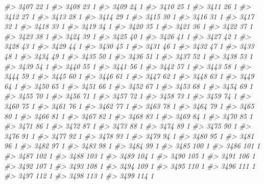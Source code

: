 \documentclass[]{article}
\newenvironment{Shaded}{\begin{snugshade}}{\end{snugshade}}
\newcommand{\CommentTok}[1]{\textcolor[rgb]{0.56,0.35,0.01}{\textit{#1}}}
\begin{document}
\begin{Shaded}
\begin{Highlighting}[]
\CommentTok{#> 3407  22  1}
\CommentTok{#> 3408  23  1}
\CommentTok{#> 3409  24  1}
\CommentTok{#> 3410  25  1}
\CommentTok{#> 3411  26  1}
\CommentTok{#> 3412  27  1}
\CommentTok{#> 3413  28  1}
\CommentTok{#> 3414  29  1}
\CommentTok{#> 3415  30  1}
\CommentTok{#> 3416  31  1}
\CommentTok{#> 3417  32  1}
\CommentTok{#> 3418  33  1}
\CommentTok{#> 3419  34  1}
\CommentTok{#> 3420  35  1}
\CommentTok{#> 3421  36  1}
\CommentTok{#> 3422  37  1}
\CommentTok{#> 3423  38  1}
\CommentTok{#> 3424  39  1}
\CommentTok{#> 3425  40  1}
\CommentTok{#> 3426  41  1}
\CommentTok{#> 3427  42  1}
\CommentTok{#> 3428  43  1}
\CommentTok{#> 3429  44  1}
\CommentTok{#> 3430  45  1}
\CommentTok{#> 3431  46  1}
\CommentTok{#> 3432  47  1}
\CommentTok{#> 3433  48  1}
\CommentTok{#> 3434  49  1}
\CommentTok{#> 3435  50  1}
\CommentTok{#> 3436  51  1}
\CommentTok{#> 3437  52  1}
\CommentTok{#> 3438  53  1}
\CommentTok{#> 3439  54  1}
\CommentTok{#> 3440  55  1}
\CommentTok{#> 3441  56  1}
\CommentTok{#> 3442  57  1}
\CommentTok{#> 3443  58  1}
\CommentTok{#> 3444  59  1}
\CommentTok{#> 3445  60  1}
\CommentTok{#> 3446  61  1}
\CommentTok{#> 3447  62  1}
\CommentTok{#> 3448  63  1}
\CommentTok{#> 3449  64  1}
\CommentTok{#> 3450  65  1}
\CommentTok{#> 3451  66  1}
\CommentTok{#> 3452  67  1}
\CommentTok{#> 3453  68  1}
\CommentTok{#> 3454  69  1}
\CommentTok{#> 3455  70  1}
\CommentTok{#> 3456  71  1}
\CommentTok{#> 3457  72  1}
\CommentTok{#> 3458  73  1}
\CommentTok{#> 3459  74  1}
\CommentTok{#> 3460  75  1}
\CommentTok{#> 3461  76  1}
\CommentTok{#> 3462  77  1}
\CommentTok{#> 3463  78  1}
\CommentTok{#> 3464  79  1}
\CommentTok{#> 3465  80  1}
\CommentTok{#> 3466  81  1}
\CommentTok{#> 3467  82  1}
\CommentTok{#> 3468  83  1}
\CommentTok{#> 3469  84  1}
\CommentTok{#> 3470  85  1}
\CommentTok{#> 3471  86  1}
\CommentTok{#> 3472  87  1}
\CommentTok{#> 3473  88  1}
\CommentTok{#> 3474  89  1}
\CommentTok{#> 3475  90  1}
\CommentTok{#> 3476  91  1}
\CommentTok{#> 3477  92  1}
\CommentTok{#> 3478  93  1}
\CommentTok{#> 3479  94  1}
\CommentTok{#> 3480  95  1}
\CommentTok{#> 3481  96  1}
\CommentTok{#> 3482  97  1}
\CommentTok{#> 3483  98  1}
\CommentTok{#> 3484  99  1}
\CommentTok{#> 3485 100  1}
\CommentTok{#> 3486 101  1}
\CommentTok{#> 3487 102  1}
\CommentTok{#> 3488 103  1}
\CommentTok{#> 3489 104  1}
\CommentTok{#> 3490 105  1}
\CommentTok{#> 3491 106  1}
\CommentTok{#> 3492 107  1}
\CommentTok{#> 3493 108  1}
\CommentTok{#> 3494 109  1}
\CommentTok{#> 3495 110  1}
\CommentTok{#> 3496 111  1}
\CommentTok{#> 3497 112  1}
\CommentTok{#> 3498 113  1}
\CommentTok{#> 3499 114  1}

\end{Highlighting}
\end{Shaded}
\end{document}

